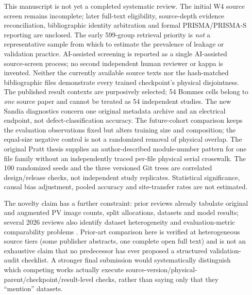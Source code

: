 \documentclass[10pt,a4paper]{article}
\begin{document}
This manuscript is not yet a completed systematic review. The initial W4 source screen remains incomplete; later full-text eligibility, source-depth evidence reconciliation, bibliographic identity arbitration and formal PRISMA/PRISMA-S reporting are unclosed. The early 599-group retrieval priority is \emph{not} a representative sample from which to estimate the prevalence of leakage or validation practice. AI-assisted screening is reported as a single AI-assisted source-screen process; no second independent human reviewer or kappa is invented. Neither the currently available source texts nor the hash-matched bibliographic files demonstrate every trained checkpoint's physical disjointness. The published result contexts are purposively selected; 54 Bommes cells belong to \emph{one} source paper and cannot be treated as 54 independent studies. The new Sandia diagnostics concern one original metadata archive and an electrical endpoint, not defect-classification accuracy. The future-cohort comparison keeps the evaluation observations fixed but alters training size and composition; the equal-size negative control is not a randomized removal of physical overlap. The original Pratt thesis supplies an author-described module-number pattern for one file family without an independently traced per-file physical serial crosswalk. The 100 randomized seeds and the three versioned Git trees are correlated design/release checks, not independent study replicates. Statistical significance, causal bias adjustment, pooled accuracy and site-transfer rates are not estimated.

The novelty claim has a further constraint: prior reviews already tabulate original and augmented PV image counts, split allocations, datasets and model results; several 2026 reviews also identify dataset heterogeneity and evaluation-metric comparability problems \cite{ali2026,meena2026,ieee2026,rahman2026,pillai2027}. Prior-art comparison here is verified at heterogeneous source tiers (some publisher abstracts, one complete open full text) and is not an exhaustive claim that no predecessor has ever proposed a structured validation-audit checklist. A stronger final submission would systematically distinguish which competing works actually execute source-version/physical-parent/checkpoint/result-level checks, rather than saying only that they ``mention'' datasets.
\end{document}
